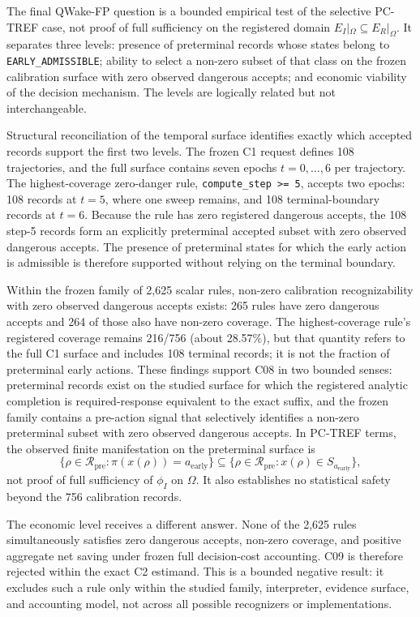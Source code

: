 The final QWake-FP question is a bounded empirical test of the selective PC-TREF case,
not proof of full sufficiency on the registered domain
$E_I|_\Omega\subseteq E_R|_\Omega$. It separates three levels: presence of
preterminal records whose states belong to \texttt{EARLY\_ADMISSIBLE}; ability to
select a non-zero subset of that class on the frozen calibration surface with zero
observed dangerous accepts; and economic viability of the decision mechanism. The
levels are logically related but not interchangeable.

Structural reconciliation of the temporal surface identifies exactly which accepted
records support the first two levels. The frozen C1 request defines 108 trajectories,
and the full surface contains seven epochs \(t=0,\ldots,6\) per trajectory. The
highest-coverage zero-danger rule, \texttt{compute\_step >= 5}, accepts two epochs: 108
records at \(t=5\), where one sweep remains, and 108 terminal-boundary records at
\(t=6\). Because the rule has zero registered dangerous accepts, the 108 step-5 records
form an explicitly preterminal accepted subset with zero observed dangerous accepts.
The presence of preterminal states for which the early action is admissible is therefore
supported without relying on the terminal boundary.

Within the frozen family of 2,625 scalar rules, non-zero calibration recognizability
with zero observed dangerous accepts exists: 265 rules have zero dangerous accepts and
264 of those also have non-zero coverage. The highest-coverage rule's registered
coverage remains 216/756 (about 28.57\%), but that quantity refers to the full C1
surface and includes 108 terminal records; it is not the fraction of preterminal early
actions. These findings support C08 in two bounded senses: preterminal records exist on
the studied surface for which the registered analytic completion is required-response
equivalent to the exact suffix, and the frozen family contains a pre-action signal that
selectively identifies a non-zero preterminal subset with zero observed dangerous
accepts. In PC-TREF terms, the observed finite manifestation on the preterminal surface
is
\[
  \{\rho\in\mathcal R_{\mathrm{pre}}:\pi(x(\rho))=a_{\mathrm{early}}\}
  \subseteq
  \{\rho\in\mathcal R_{\mathrm{pre}}:x(\rho)\in S_{a_{\mathrm{early}}}\},
\]
not proof of full sufficiency of \(\phi_I\) on \(\Omega\). It also establishes no
statistical safety beyond the 756 calibration records.

The economic level receives a different answer. None of the 2,625 rules simultaneously
satisfies zero dangerous accepts, non-zero coverage, and positive aggregate net saving
under frozen full decision-cost accounting. C09 is therefore rejected within the exact
C2 estimand. This is a bounded negative result: it excludes such a rule only within the
studied family, interpreter, evidence surface, and accounting model, not across all
possible recognizers or implementations.

